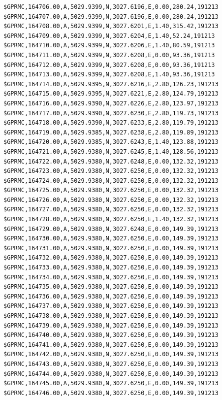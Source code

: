\documentclass[simple,a4paper,14pt,ukrainian,utf8]{eskdtext}
\begin{document}
\begin{appendices}
\begin{small}
\begin{lstlisting}
$GPRMC,164706.00,A,5029.9399,N,3027.6196,E,0.00,280.24,191213
$GPRMC,164707.00,A,5029.9399,N,3027.6196,E,0.00,280.24,191213
$GPRMC,164708.00,A,5029.9399,N,3027.6201,E,1.40,315.42,191213
$GPRMC,164709.00,A,5029.9399,N,3027.6204,E,1.40,52.24,191213
$GPRMC,164710.00,A,5029.9399,N,3027.6206,E,1.40,80.59,191213
$GPRMC,164711.00,A,5029.9399,N,3027.6208,E,0.00,93.36,191213
$GPRMC,164712.00,A,5029.9399,N,3027.6208,E,0.00,93.36,191213
$GPRMC,164713.00,A,5029.9399,N,3027.6208,E,1.40,93.36,191213
$GPRMC,164714.00,A,5029.9395,N,3027.6216,E,2.80,126.23,191213
$GPRMC,164715.00,A,5029.9395,N,3027.6221,E,2.80,124.79,191213
$GPRMC,164716.00,A,5029.9390,N,3027.6226,E,2.80,123.97,191213
$GPRMC,164717.00,A,5029.9390,N,3027.6230,E,2.80,119.73,191213
$GPRMC,164718.00,A,5029.9390,N,3027.6233,E,2.80,119.79,191213
$GPRMC,164719.00,A,5029.9385,N,3027.6238,E,2.80,119.89,191213
$GPRMC,164720.00,A,5029.9385,N,3027.6243,E,1.40,123.88,191213
$GPRMC,164721.00,A,5029.9380,N,3027.6245,E,1.40,128.56,191213
$GPRMC,164722.00,A,5029.9380,N,3027.6248,E,0.00,132.32,191213
$GPRMC,164723.00,A,5029.9380,N,3027.6250,E,0.00,132.32,191213
$GPRMC,164724.00,A,5029.9380,N,3027.6250,E,0.00,132.32,191213
$GPRMC,164725.00,A,5029.9380,N,3027.6250,E,0.00,132.32,191213
$GPRMC,164726.00,A,5029.9380,N,3027.6250,E,0.00,132.32,191213
$GPRMC,164727.00,A,5029.9380,N,3027.6250,E,0.00,132.32,191213
$GPRMC,164728.00,A,5029.9380,N,3027.6250,E,1.40,132.32,191213
$GPRMC,164729.00,A,5029.9380,N,3027.6248,E,0.00,149.39,191213
$GPRMC,164730.00,A,5029.9380,N,3027.6250,E,0.00,149.39,191213
$GPRMC,164731.00,A,5029.9380,N,3027.6250,E,0.00,149.39,191213
$GPRMC,164732.00,A,5029.9380,N,3027.6250,E,0.00,149.39,191213
$GPRMC,164733.00,A,5029.9380,N,3027.6250,E,0.00,149.39,191213
$GPRMC,164734.00,A,5029.9380,N,3027.6250,E,0.00,149.39,191213
$GPRMC,164735.00,A,5029.9380,N,3027.6250,E,0.00,149.39,191213
$GPRMC,164736.00,A,5029.9380,N,3027.6250,E,0.00,149.39,191213
$GPRMC,164737.00,A,5029.9380,N,3027.6250,E,0.00,149.39,191213
$GPRMC,164738.00,A,5029.9380,N,3027.6250,E,0.00,149.39,191213
$GPRMC,164739.00,A,5029.9380,N,3027.6250,E,0.00,149.39,191213
$GPRMC,164740.00,A,5029.9380,N,3027.6250,E,0.00,149.39,191213
$GPRMC,164741.00,A,5029.9380,N,3027.6250,E,0.00,149.39,191213
$GPRMC,164742.00,A,5029.9380,N,3027.6250,E,0.00,149.39,191213
$GPRMC,164743.00,A,5029.9380,N,3027.6250,E,0.00,149.39,191213
$GPRMC,164744.00,A,5029.9380,N,3027.6250,E,0.00,149.39,191213
$GPRMC,164745.00,A,5029.9380,N,3027.6250,E,0.00,149.39,191213
$GPRMC,164746.00,A,5029.9380,N,3027.6250,E,0.00,149.39,191213
\end{lstlisting}
\end{small}


\end{appendices}
\end{document}
